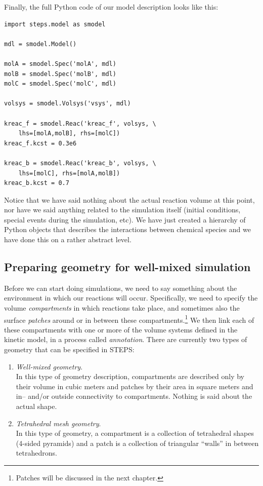 \documentclass[a4paper,12pt]{book}
\begin{document}
Finally, the full Python code of our model description looks like this:

\begin{verbatim}
import steps.model as smodel

mdl = smodel.Model()

molA = smodel.Spec('molA', mdl)
molB = smodel.Spec('molB', mdl)
molC = smodel.Spec('molC', mdl)

volsys = smodel.Volsys('vsys', mdl)

kreac_f = smodel.Reac('kreac_f', volsys, \
    lhs=[molA,molB], rhs=[molC])
kreac_f.kcst = 0.3e6

kreac_b = smodel.Reac('kreac_b', volsys, \
    lhs=[molC], rhs=[molA,molB])
kreac_b.kcst = 0.7
\end{verbatim}

Notice that we have said nothing about the actual reaction volume at this point, nor have we said anything related to the simulation itself (initial conditions, special events during the simulation, etc). We have just created a hierarchy of Python objects that describes the interactions between chemical species and we have done this on a rather abstract level.

\subsection{Preparing geometry for well-mixed simulation}

Before we can start doing simulations, we need to say something about the environment in which our reactions will occur. Specifically, we need to specify the volume \emph{compartments} in which reactions take place, and sometimes also the surface \emph{patches} around or in between these compartments.\footnote{Patches will be discussed in the next chapter.} We then link each of these compartments with one or more of the volume systems defined in the kinetic model, in a process called \emph{annotation}. There are currently two types of geometry that can be specified in STEPS:

\begin{enumerate}
\item\emph{Well-mixed geometry}.\\
In this type of geometry description, compartments are described only by their volume in cubic meters and patches by their area in square meters and in-- and/or outside connectivity to compartments. Nothing is said about the actual shape.
\item\emph{Tetrahedral mesh geometry}.\\
In this type of geometry, a compartment is a collection of tetrahedral shapes (4-sided pyramids) and a patch is a collection of triangular ``walls'' in between tetrahedrons.
\end{enumerate}
\end{document}
